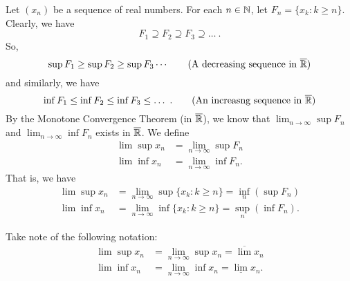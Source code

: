 \documentclass[a4paper]{article}
\begin{document}
Let \( ({x}_{n}) \) be a sequence of real numbers. For each \( n \in \mathbb{N}  \), let \( {F}_{n} = \{ {x}_{k } : k \geq n  \}  \). Clearly, we have 
\[  {F}_{1} \supseteq {F}_{2} \supseteq {F}_{3} \supseteq \dots \ . \]
So, 
\[  \sup {F}_{1} \geq \sup {F}_{2} \geq \sup {F}_{3} \cdots  \tag{A decreasing sequence in \( \overline{\R} \)} \]
and similarly, we have
\[  \inf {F}_{1} \leq \inf {F}_{2} \leq \inf {F}_{3} \leq \dots \ . \tag{An increasng sequence in \( \overline{\R} \)} \]
By the Monotone Convergence Theorem (in \( \overline{\mathbb{R}} \)), we know that \( \lim_{ n \to \infty  }  \sup {F}_{n} \) and \( \lim_{ n \to \infty  }  \inf {F}_{n} \) exists in \( \overline{\mathbb{R}} \). We define
\begin{align*}
   \lim \sup {x}_{n} &= \lim_{ n \to \infty  } \sup {F}_{n} \\
   \lim \inf {x}_{n} &= \lim_{ n \to \infty  }  \inf {F}_{n}.
\end{align*}
That is, we have 
\begin{align*}
    \lim \sup {x}_{n} &= \lim_{ n \to \infty  }  \sup \{ {x}_{k } : k \geq n  \}  = \inf_{n} (\sup {F}_{n}) \\
    \lim \inf {x}_{n} &= \lim_{ n \to \infty  }  \inf \{ {x}_{k } : k \geq n  \}  = \sup_{n} (\inf {F}_{n}).
\end{align*}

Take note of the following notation:
\begin{align*}
    \lim \sup  {x}_{n} &= \lim_{ n \to \infty  }  \sup {x}_{n} = \overline{\lim} {x}_{n} \\
    \lim \inf {x}_{n} &= \lim_{ n \to \infty  }  \inf {x}_{n} = \underline{\lim} {x}_{n}.
\end{align*}
\end{document}
